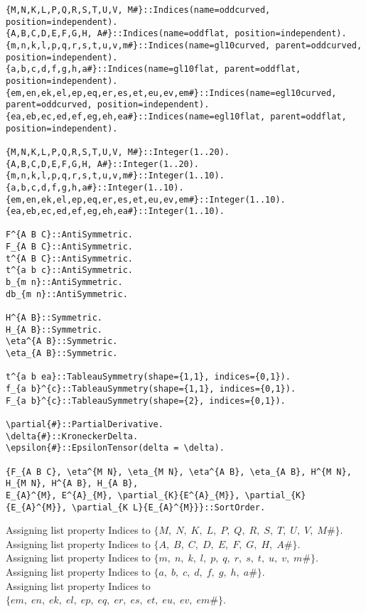 \documentclass[11pt]{article}
\begin{document}
{\color[named]{Blue}\begin{verbatim}
{M,N,K,L,P,Q,R,S,T,U,V, M#}::Indices(name=oddcurved, position=independent).
{A,B,C,D,E,F,G,H, A#}::Indices(name=oddflat, position=independent).
{m,n,k,l,p,q,r,s,t,u,v,m#}::Indices(name=gl10curved, parent=oddcurved, position=independent).
{a,b,c,d,f,g,h,a#}::Indices(name=gl10flat, parent=oddflat, position=independent).
{em,en,ek,el,ep,eq,er,es,et,eu,ev,em#}::Indices(name=egl10curved, parent=oddcurved, position=independent).
{ea,eb,ec,ed,ef,eg,eh,ea#}::Indices(name=egl10flat, parent=oddflat, position=independent).

{M,N,K,L,P,Q,R,S,T,U,V, M#}::Integer(1..20).
{A,B,C,D,E,F,G,H, A#}::Integer(1..20).
{m,n,k,l,p,q,r,s,t,u,v,m#}::Integer(1..10).
{a,b,c,d,f,g,h,a#}::Integer(1..10).
{em,en,ek,el,ep,eq,er,es,et,eu,ev,em#}::Integer(1..10).
{ea,eb,ec,ed,ef,eg,eh,ea#}::Integer(1..10).

F^{A B C}::AntiSymmetric.
F_{A B C}::AntiSymmetric.
t^{A B C}::AntiSymmetric.
t^{a b c}::AntiSymmetric.
b_{m n}::AntiSymmetric.
db_{m n}::AntiSymmetric.

H^{A B}::Symmetric.
H_{A B}::Symmetric.
\eta^{A B}::Symmetric.
\eta_{A B}::Symmetric.

t^{a b ea}::TableauSymmetry(shape={1,1}, indices={0,1}).
f_{a b}^{c}::TableauSymmetry(shape={1,1}, indices={0,1}).
F_{a b}^{c}::TableauSymmetry(shape={2}, indices={0,1}).

\partial{#}::PartialDerivative.
\delta{#}::KroneckerDelta.
\epsilon{#}::EpsilonTensor(delta = \delta).

{F_{A B C}, \eta^{M N}, \eta_{M N}, \eta^{A B}, \eta_{A B}, H^{M N}, H_{M N}, H^{A B}, H_{A B},
E_{A}^{M}, E^{A}_{M}, \partial_{K}{E^{A}_{M}}, \partial_{K}{E_{A}^{M}}, \partial_{K L}{E_{A}^{M}}}::SortOrder.
\end{verbatim}}
Assigning list property Indices to $\{M,\; N,\; K,\; L,\; P,\; Q,\; R,\; S,\; T,\; U,\; V,\; M\#\}$.
\\
Assigning list property Indices to $\{A,\; B,\; C,\; D,\; E,\; F,\; G,\; H,\; A\#\}$.
\\
Assigning list property Indices to $\{m,\; n,\; k,\; l,\; p,\; q,\; r,\; s,\; t,\; u,\; v,\; m\#\}$.
\\
Assigning list property Indices to $\{a,\; b,\; c,\; d,\; f,\; g,\; h,\; a\#\}$.
\\
Assigning list property Indices to $\{em,\; en,\; ek,\; el,\; ep,\; eq,\; er,\; es,\; et,\; eu,\; ev,\; em\#\}$.
\end{document}

